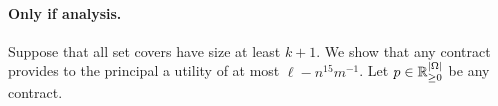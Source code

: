	\paragraph{\textbf{Only if analysis.}}
	Suppose that all set covers have size at least $k+1$.
	We show that any contract provides to the principal a utility of at most $\ell-n^{15}m^{-1}$.
	Let $p\in\mathbb{R}^{|\Omega|}_{\ge 0}$ be any contract.
	
